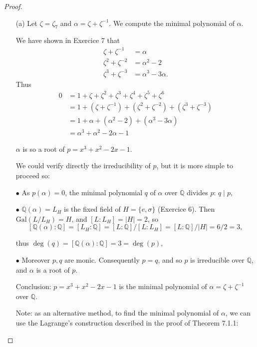\documentclass[11pt,a4paper]{article}
\newcommand{\Q}{\mathbb{Q}}
\newcommand{\Gal}{\mathrm{Gal}}
\begin{document}
\begin{proof}
\begin{enumerate}
\item[(a)]
Let $\zeta = \zeta_7$ and $\alpha = \zeta +\zeta^{-1}$.
We compute the minimal polynomial of $\alpha$.

We have shown in Exercice 7 that
\begin{align*}
  \zeta + \zeta^{-1} &= \alpha\\ 
 \zeta^2+\zeta^{-2} &= \alpha^2-2\\
 \zeta^3 + \zeta^{-3}  &= \alpha^3-3\alpha.
 \end{align*}
Thus
 \begin{align*}
 0 &=1+\zeta + \zeta^2+\zeta^3+\zeta^4+\zeta^5+\zeta^6\\
 &=1 + (\zeta+\zeta^{-1}) + (\zeta^2+\zeta^{-2})+ (\zeta^3 + \zeta^{-3})\\
 &=1+\alpha+(\alpha^2-2)+(\alpha^3-3\alpha)\\
 &=\alpha^3+\alpha^2-2\alpha-1
 \end{align*}
 
 $\alpha$ is so a root of $p = x^3+x^2-2x-1$.
 
 We could verify directly the irreducibility of $p$, but it is more simple to proceed so:
 
$\bullet$ As $p(\alpha)=0$, the minimal polynomial $q$ of $\alpha$ over $\mathbb{Q}$ divides $p$: $q \mid p$,

$\bullet$  $\Q(\alpha) =L_H$ is the fixed field of $H = \{e,\sigma\}$ (Exercice 6). Then $\Gal(L/L_H) = H$, and $[L:L_H] = \vert H \vert = 2$, so $$[\Q(\alpha) : \Q] = [L_H:\Q] = [L:\Q]/[L : L_H] = [L:\Q]/ \vert H \vert = 6/2 =3,$$ 

thus $\deg(q) = [\Q(\alpha) : \mathbb{Q}] = 3 = \deg(p)$,

$\bullet$ Moreover  $p,q$ are monic. 
Consequently $p=q$, and so $p$ is irreducible over $\Q$, and $\alpha$ is a root of $p$.

Conclusion: $p=x^3+x^2-2x-1$ is the minimal polynomial of $\alpha = \zeta+\zeta^{-1}$ over $\Q$.

Note: as an alternative method, to find the minimal polynomial of $\alpha$, we can use the Lagrange's construction described in the proof of Theorem 7.1.1:


\end{enumerate}
\end{proof}
\end{document}
